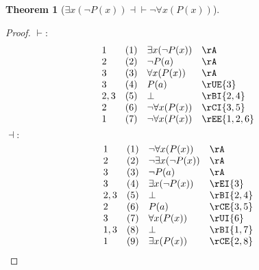 \documentclass{book}
\theoremstyle{plain}
\newtheorem{theorem}{Theorem}
\theoremstyle{remark}
\theoremstyle{definition}
\begin{document}
\label{ExxLpnPLpxRpRpEqvnFaxLpPLpxRpRp}
\begin{theorem}[\(\exists x(\neg P(x)) \dashv\vdash \neg\forall x (P(x))\)]	
\end{theorem}
\begin{proof}
	\(\vdash:\)
	\[
	\begin{array}{llll}
		1 & (1) & \exists x(\neg P(x)) & \rA \\
		2 & (2) & \neg P(a) & \rA \\
		3 & (3) & \forall x (P(x)) & \rA \\
		3 & (4) & P(a) & \rUE{3} \\
		2,3 & (5) & \bot & \rBI{2,4} \\
		2 & (6) & \neg\forall x(P(x)) & \rCI{3,5} \\
		1 & (7) & \neg\forall x(P(x)) & \rEE{1,2,6} \\
	\end{array}
	\]
	\(\dashv:\)
	\[
	\begin{array}{llll}
		1 & (1) & \neg\forall x(P(x)) & \rA \\
		2 & (2) & \neg \exists x(\neg P(x)) & \rA \\
		3 & (3) & \neg P(a) & \rA \\
		3 & (4) & \exists x(\neg P(x)) & \rEI{3} \\
		2,3 & (5) & \bot & \rBI{2,4} \\
		2 & (6) & P(a) & \rCE{3,5} \\
		3 & (7) & \forall x(P(x)) & \rUI{6} \\
		1,3 & (8) & \bot & \rBI{1,7} \\
		1 & (9) & \exists x(P(x)) & \rCE{2,8} \\
	\end{array}
	\]
\end{proof}
\end{document}
